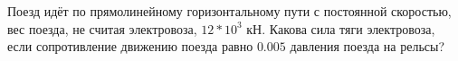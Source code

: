 Поезд идёт по прямолинейному горизонтальному пути с постоянной
скоростью, вес поезда, не считая электровоза, $12*10^3$ кН. Какова сила
тяги электровоза, если сопротивление движению поезда равно $0.005$
давления поезда на рельсы?
